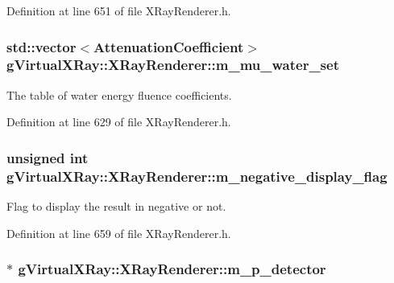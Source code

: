 Definition at line 651 of file XRayRenderer.h.

\hypertarget{classg_virtual_x_ray_1_1_x_ray_renderer_a26aff3c3fd71edffc1559635eae312f3}{
\subsubsection[{m\_\-mu\_\-water\_\-set}]{\setlength{\rightskip}{0pt plus 5cm}std::vector$<${\bf AttenuationCoefficient}$>$ {\bf gVirtualXRay::XRayRenderer::m\_\-mu\_\-water\_\-set}}}
\label{classg_virtual_x_ray_1_1_x_ray_renderer_a26aff3c3fd71edffc1559635eae312f3}


The table of water energy fluence coefficients. 



Definition at line 629 of file XRayRenderer.h.

\hypertarget{classg_virtual_x_ray_1_1_x_ray_renderer_a8ae2b2b8eb0fe41316fcebcb7cfcd814}{
\subsubsection[{m\_\-negative\_\-display\_\-flag}]{\setlength{\rightskip}{0pt plus 5cm}unsigned int {\bf gVirtualXRay::XRayRenderer::m\_\-negative\_\-display\_\-flag}}}
\label{classg_virtual_x_ray_1_1_x_ray_renderer_a8ae2b2b8eb0fe41316fcebcb7cfcd814}


Flag to display the result in negative or not. 



Definition at line 659 of file XRayRenderer.h.

\hypertarget{classg_virtual_x_ray_1_1_x_ray_renderer_abe635fe1136fa3936fd5439cf888aad9}{
\subsubsection[{m\_\-p\_\-detector}]{$\ast$ {\bf gVirtualXRay::XRayRenderer::m\_\-p\_\-detector}}}
\label{classg_virtual_x_ray_1_1_x_ray_renderer_abe635fe1136fa3936fd5439cf888aad9}


